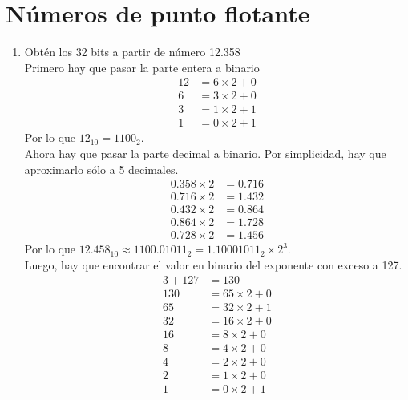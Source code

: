 \documentclass{article}
\begin{document}
    \section{Números de punto flotante}
    \begin{enumerate}
        \item {
            Obtén los 32 bits a partir de número 12.358 \\
            Primero hay que pasar la parte entera a binario
            \begin{align*}
                12 &= 6 \times 2 + 0 \\
                6 &= 3 \times 2 + 0 \\
                3 &= 1 \times 2 + 1 \\
                1 &= 0 \times 2 + 1
            \end{align*}
            Por lo que $12_{10} = 1100_{2}$.\\
            Ahora hay que pasar la parte decimal a binario. Por simplicidad, hay
            que aproximarlo sólo a 5 decimales.
            \begin{align*}
                0.358 \times 2 &= 0.716 \\
                0.716 \times 2 &= 1.432 \\
                0.432 \times 2 &= 0.864 \\
                0.864 \times 2 &= 1.728 \\
                0.728 \times 2 &= 1.456
            \end{align*}
            Por lo que $12.458_{10} \approx 1100.01011_{2} 
            = 1.10001011_{2} \times 2 ^ 3$.\\
            Luego, hay que encontrar el valor en binario del exponente con exceso
            a 127.
            \begin{align*}
                3 + 127 &= 130 \\
                130 &= 65 \times 2 + 0 \\
                65 &= 32 \times 2 + 1 \\
                32 &= 16 \times 2 + 0 \\
                16 &= 8 \times 2 + 0 \\
                8 &= 4 \times 2 + 0 \\
                4 &= 2 \times 2 + 0 \\
                2 &= 1 \times 2 + 0 \\
                1 &= 0 \times 2 + 1
            \end{align*}
}
\end{enumerate}
\end{document}
